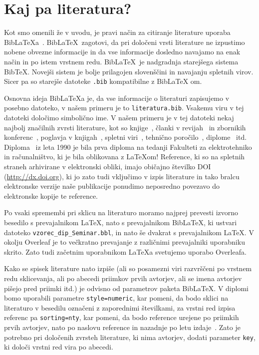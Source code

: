 \chapter{Kaj pa literatura?}
\label{lit}

Kot smo omenili že v uvodu, je pravi način za citiranje literature uporaba BibLaTeXa~\cite{biblatex}.
BibLaTeX\ zagotovi, da pri določeni vrsti literature ne izpustimo nobene obvezne informacije
in da vse informacije dosledno navajamo na enak način in po istem vrstnem redu.
BibLaTeX\ je nadgradnja starejšega sistema BibTeX.
Novejši sistem je bolje prilagojen slovenščini in navajanju spletnih virov.
Sicer pa so starejše datoteke \texttt{.bib} kompatibilne z BibLaTeX om.

Osnovna ideja BibLaTeXa je, da vse informacije o literaturi zapisujemo v posebno datoteko,
v našem primeru je to \texttt{literatura.bib}.
Vsakemu viru v tej datoteki določimo simbolično ime.
V našem primeru je v tej datoteki nekaj najbolj značilnih zvrsti literature, kot so knjige~\cite{lamport},
članki v revijah~\cite{leonardo} in zbornikih konferenc~\cite{ciuha2010visualization}, poglavja v
knjigah~\cite{poglavje_springer}, spletni viri~\cite{slovarji,video}, tehnično
poročilo~\cite{andersen2012kinect}, diplome~\cite{diploma} itd.
Diploma~\cite{diploma} iz leta 1990 je bila prva diploma na tedanji Fakulteti za elektrotehniko
in računalništvo, ki je bila oblikovana z \LaTeX om!
Reference, ki so na spletnih straneh arhivirane v elektronski obliki, imajo običajno \v stevilko
DOI (\url{http://dx.doi.org}), ki jo zato tudi vključimo v izpis literature in tako bralcu
elektronske verzije naše publikacije ponudimo neposredno povezavo do elektronske kopije te reference.

Po vsaki spremembi pri sklicu na literaturo moramo najprej prevesti izvorno besedilo s prevajalnikom
\LaTeX, nato s prevajalnikom BibLaTeX, ki ustvari datoteko {\tt vzorec\_dip\_Seminar.bbl},
in nato še dvakrat s prevajalnikom \LaTeX.
V okolju Overleaf je to večkratno prevajanje z različnimi prevajalniki uporabniku skrito.
Zato tudi začetnim uporabnikom \LaTeX a svetujemo uporabo Overleafa.

Kako se spisek literature nato izpiše (ali so posamezni viri razvrščeni po vrstnem redu sklicevanja,
ali po abecedi priimkov prvih avtorjev, ali se imena avtorjev pišejo pred priimki itd.) je odvisno
od parametrov paketa BibLaTeX.
V diplomi bomo uporabili parametre \texttt{style=numeric}, kar pomeni, da bodo sklici na literaturo
v besedilu označeni z zaporednimi številkami, za vrstni red izpisa referenc pa \texttt{sorting=nty},
kar pomeni, da bodo reference urejene po priimkih prvih avtorjev, nato po naslovu reference in
nazadnje po letu izdaje~\cite{ctan}.
Zato je potrebno pri določenih zvrsteh literature, ki nima avtorjev, dodati parameter \texttt{key},
ki določi vrstni red vira po abecedi.

